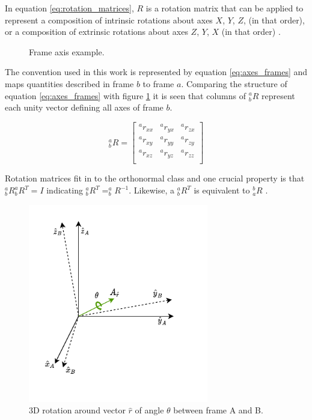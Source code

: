 In equation \ref{eq:rotation_matrices}, $R$ is a rotation matrix that can be applied to represent a composition of intrinsic rotations about axes $X$, $Y$, $Z$, (in that order), or a composition of extrinsic rotations about axes $Z$, $Y$, $X$ (in that order) \cite{weisstein2003rotation}.

\begin{figure}[!h]
    \centering
    \resizebox{0.44\linewidth}{!}{}
    \resizebox{0.54\linewidth}{!}{}
    \caption{Frame axis example.}
    \label{fig:axes_frames}
\end{figure}

The convention used in this work is represented by equation \ref{eq:axes_frames} and maps quantities described in frame $b$ to frame $a$. Comparing the structure of equation \ref{eq:axes_frames} with figure \ref{fig:axes_frames} it is seen that columns of $^a_bR$ represent each unity vector defining all axes of frame $b$.

\begin{equation}
    \textrm{$_{b}^{a}R$}
    =
    \begin{bmatrix}
        \textrm{$^{a}r_{xx}$} & \textrm{$^{a}r_{yx}$} & \textrm{$^{a}r_{zx}$} \\
        \textrm{$^{a}r_{xy}$} & \textrm{$^{a}r_{yy}$} & \textrm{$^{a}r_{zy}$} \\
        \textrm{$^{a}r_{xz}$} & \textrm{$^{a}r_{yz}$} & \textrm{$^{a}r_{zz}$} \\
    \end{bmatrix}
    \label{eq:axes_frames}
\end{equation}

Rotation matrices fit in to the orthonormal class and one crucial property is that $^a_bR ^a_bR^T = I$ indicating $^a_bR^T = ^a_bR^{-1}$. Likewise, a $^a_bR^T$ is equivalent to $^b_aR$ \cite{gruber2000mathematics}.

\begin{figure}[!h]
    \centering
    \includegraphics[width=0.7\textwidth]{figures/rotation.pdf}
    \caption{ 3D rotation around vector $\hat{r}$ of angle $\theta$ between frame A and B. }
    \label{fig:rotation}
\end{figure}

